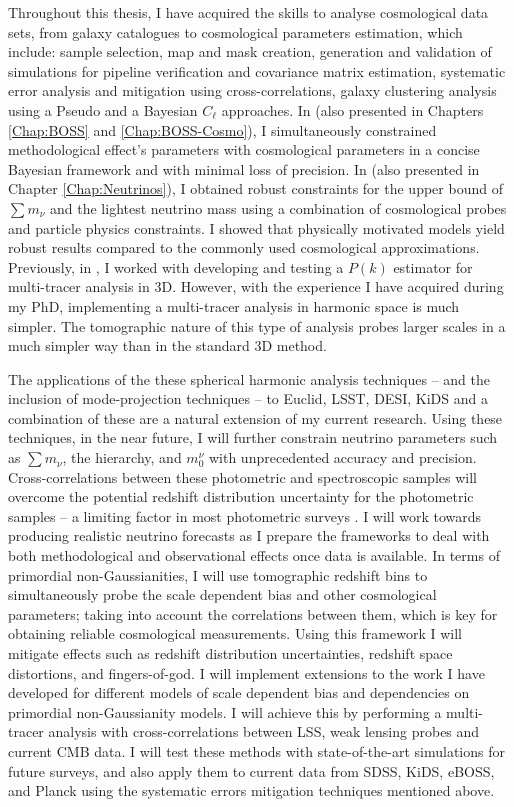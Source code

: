 \qquad Throughout this thesis, I have acquired the skills to analyse cosmological data sets, from galaxy catalogues to cosmological parameters estimation, which include: sample selection, map and mask creation, generation and validation of simulations for pipeline verification and covariance matrix estimation, systematic error analysis and mitigation using cross-correlations, galaxy clustering analysis using a Pseudo and a Bayesian $C_{\ell}$ approaches. In \cite{2018LoureiroBOSS} (also presented in Chapters \ref{Chap:BOSS} and \ref{Chap:BOSS-Cosmo}), I simultaneously constrained methodological effect's parameters with cosmological parameters in a concise Bayesian framework and with minimal loss of precision. In \cite{2018LoureiroNeutrinos} (also presented in Chapter \ref{Chap:Neutrinos}), I obtained robust constraints for the upper bound of $\sum m_{\nu}$ and the lightest neutrino mass using a combination of cosmological probes and particle physics constraints. I showed that physically motivated models yield robust results compared to the commonly used cosmological approximations. Previously, in \cite{2016AbramoSeccoLoureiro}, I worked with developing and testing a $P(k)$ estimator for multi-tracer analysis in 3D. However, with the experience I have acquired during my PhD, implementing a multi-tracer analysis in harmonic space is much simpler. The tomographic nature of this type of analysis probes larger scales in a much simpler way than in the standard 3D method.

\qquad The applications of the these spherical harmonic analysis techniques -- and the inclusion of mode-projection techniques -- to Euclid, LSST, DESI, KiDS and a combination of these are a natural extension of my current research. Using these techniques, in the near future, I will further constrain neutrino parameters such as $\sum m_{\nu}$, the hierarchy, and $m_{0}^{\nu}$ with unprecedented accuracy and precision. Cross-correlations between these photometric and spectroscopic samples will overcome the potential redshift distribution uncertainty for the photometric samples -- a limiting factor in most photometric surveys \citep{2016McLeod}. I will work towards producing realistic neutrino forecasts as I prepare the frameworks to deal with both methodological and observational effects once data is available. In terms of primordial non-Gaussianities, I will use tomographic redshift bins to simultaneously probe the scale dependent bias and other cosmological parameters; taking into account the correlations between them, which is key for obtaining reliable cosmological measurements. Using this framework I will mitigate effects such as redshift distribution uncertainties, redshift space distortions, and fingers-of-god. I will implement extensions to the work I have developed for different models of scale dependent bias and dependencies on primordial non-Gaussianity models. I will achieve this by performing a multi-tracer analysis with cross-correlations between LSS, weak lensing probes and current CMB data. I will test these methods with state-of-the-art simulations for future surveys, and also apply them to current data from SDSS, KiDS, eBOSS, and Planck using the systematic errors mitigation techniques mentioned above. 


